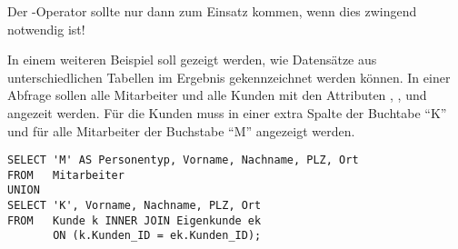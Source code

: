           \begin{merke}
            Der -Operator sollte nur dann zum Einsatz kommen, wenn dies zwingend notwendig ist!
          \end{merke}
          In einem weiteren Beispiel soll gezeigt werden, wie Datensätze aus unterschiedlichen Tabellen im Ergebnis gekennzeichnet werden können. In einer Abfrage sollen alle Mitarbeiter und alle Kunden mit den Attributen , ,  und  angezeit werden. Für die Kunden muss in einer extra Spalte der Buchtabe \enquote{K} und für alle Mitarbeiter der Buchstabe \enquote{M} angezeigt werden.
          \begin{lstlisting}[language=oracle_sql,caption={Spalten mit konstanten Werten und UNION},label=sql04_24]
SELECT 'M' AS Personentyp, Vorname, Nachname, PLZ, Ort
FROM   Mitarbeiter
UNION
SELECT 'K', Vorname, Nachname, PLZ, Ort
FROM   Kunde k INNER JOIN Eigenkunde ek
       ON (k.Kunden_ID = ek.Kunden_ID);
          \end{lstlisting}
